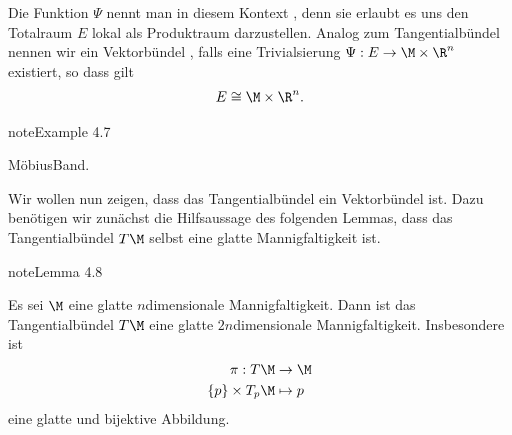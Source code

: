 \documentclass[letterpaper,10pt,german]{jupyterBook}
\begin{document}
\sphinxAtStartPar
Die Funktion \(\Psi\) nennt man in diesem Kontext , denn sie erlaubt es uns den Totalraum \(E\) lokal als Produktraum darzustellen.
Analog zum Tangentialbündel nennen wir ein Vektorbündel , falls eine Trivialsierung \(\Psi:E\to \M\times\R^n\) existiert, so dass gilt
\begin{equation*}
\begin{split}E \cong \M\times\R^n.\end{split}
\end{equation*}\label{manifolds/tangential:example-26}
\begin{sphinxadmonition}{note}{Example 4.7}



\sphinxAtStartPar
Möbius\sphinxhyphen{}Band.
\end{sphinxadmonition}

\sphinxAtStartPar
Wir wollen nun zeigen, dass das Tangentialbündel ein Vektorbündel ist.
Dazu benötigen wir zunächst die Hilfsaussage des folgenden Lemmas, dass das Tangentialbündel \(T\M\) selbst eine glatte Mannigfaltigkeit ist.
\label{manifolds/tangential:lem:tanman}
\begin{sphinxadmonition}{note}{Lemma 4.8}



\sphinxAtStartPar
Es sei \(\M\) eine glatte \(n\)\sphinxhyphen{}dimensionale Mannigfaltigkeit.
Dann ist das Tangentialbündel \(T\M\) eine glatte \(2n\)\sphinxhyphen{}dimensionale Mannigfaltigkeit.
Insbesondere ist
\begin{equation*}
\begin{split}\pi:T\M &\to \M\\
\{p\}\times T_p\M &\mapsto p\end{split}
\end{equation*}
\sphinxAtStartPar
eine glatte und bijektive Abbildung.
\end{sphinxadmonition}
\end{document}
